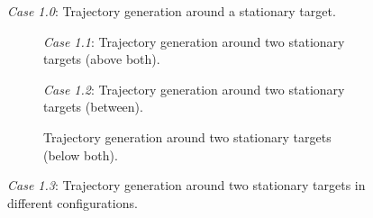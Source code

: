 \begin{figure}
    \centering
    
    \caption{\emph{Case 1.0}: Trajectory generation around a stationary target. }
    \label{fig:stationary-target}
\end{figure}

\begin{figure}
    \centering
    \begin{subfigure}[b]{\textwidth}
        \centering
        
        \caption{\emph{Case 1.1}: Trajectory generation around two stationary targets (above both).}
        \label{fig:stationary-target-2}
    \end{subfigure}
    \hfill
    \begin{subfigure}[b]{\textwidth}
        \centering
        
        \caption{\emph{Case 1.2}: Trajectory generation around two stationary targets (between).}
        \label{fig:stationary-target-3}
    \end{subfigure}
    \hfill
    \begin{subfigure}[b]{\textwidth}
        \centering
        
        \caption{Trajectory generation around two stationary targets (below both).}
        \label{fig:stationary-target-4}
    \end{subfigure}
    \caption{\emph{Case 1.3}: Trajectory generation around two stationary targets in different configurations.}
    \label{fig:stationary-targets-subfigures}
\end{figure}


